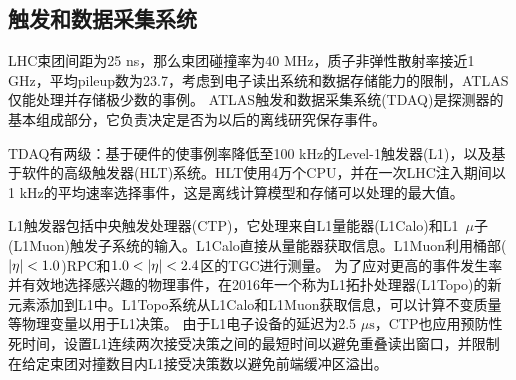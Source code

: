 \subsection{触发和数据采集系统}
LHC束团间距为25 ns，那么束团碰撞率为40 MHz，质子非弹性散射率接近1 GHz，平均pileup数为23.7，考虑到电子读出系统和数据存储能力的限制，ATLAS仅能处理并存储极少数的事例。
ATLAS触发和数据采集系统(TDAQ)\cite{Aaboud2017}是探测器的基本组成部分，它负责决定是否为以后的离线研究保存事件。

TDAQ有两级：基于硬件的使事例率降低至100 kHz的Level-1触发器(L1)，以及基于软件的高级触发器(HLT)系统。HLT使用4万个CPU，并在一次LHC注入期间以1 kHz的平均速率选择事件，这是离线计算模型和存储可以处理的最大值。

L1触发器包括中央触发处理器(CTP)，它处理来自L1量能器(L1Calo)和L1~$\mu$子(L1Muon)触发子系统的输入。L1Calo直接从量能器获取信息。L1Muon利用桶部($|\eta|<1.0$)RPC和$1.0<\abseta<2.4$区的TGC进行测量。
为了应对更高的事件发生率并有效地选择感兴趣的物理事件，在2016年一个称为L1拓扑处理器(L1Topo)\cite{Simioni:2014nha}的新元素添加到L1中。L1Topo系统从L1Calo和L1Muon获取信息，可以计算不变质量等物理变量以用于L1决策。
由于L1电子设备的延迟为2.5 $\mu\text{s}$，CTP也应用预防性死时间，设置L1连续两次接受决策之间的最短时间以避免重叠读出窗口，并限制在给定束团对撞数目内L1接受决策数以避免前端缓冲区溢出。

